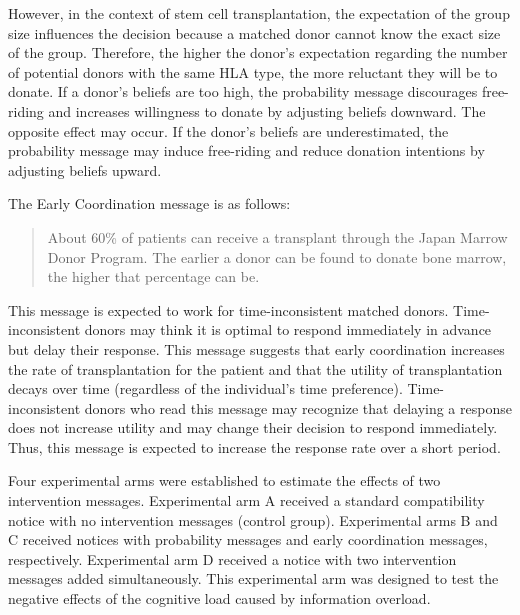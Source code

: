 \documentclass[
  11pt,
  a4paper
]{article}
\begin{document}
However, in the context of stem cell transplantation, the expectation of the group size influences the decision because a matched donor cannot know the exact size of the group. Therefore, the higher the donor's expectation regarding the number of potential donors with the same HLA type, the more reluctant they will be to donate. If a donor's beliefs are too high, the probability message discourages free-riding and increases willingness to donate by adjusting beliefs downward. The opposite effect may occur. If the donor's beliefs are underestimated, the probability message may induce free-riding and reduce donation intentions by adjusting beliefs upward.

The Early Coordination message is as follows:

\begin{quote}
About 60\% of patients can receive a transplant through the Japan Marrow Donor Program. The earlier a donor can be found to donate bone marrow, the higher that percentage can be.
\end{quote}

This message is expected to work for time-inconsistent matched donors. Time-inconsistent donors may think it is optimal to respond immediately in advance but delay their response. This message suggests that early coordination increases the rate of transplantation for the patient and that the utility of transplantation decays over time (regardless of the individual's time preference). Time-inconsistent donors who read this message may recognize that delaying a response does not increase utility and may change their decision to respond immediately. Thus, this message is expected to increase the response rate over a short period.

Four experimental arms were established to estimate the effects of two intervention messages. Experimental arm A received a standard compatibility notice with no intervention messages (control group). Experimental arms B and C received notices with probability messages and early coordination messages, respectively. Experimental arm D received a notice with two intervention messages added simultaneously. This experimental arm was designed to test the negative effects of the cognitive load caused by information overload.
\end{document}
